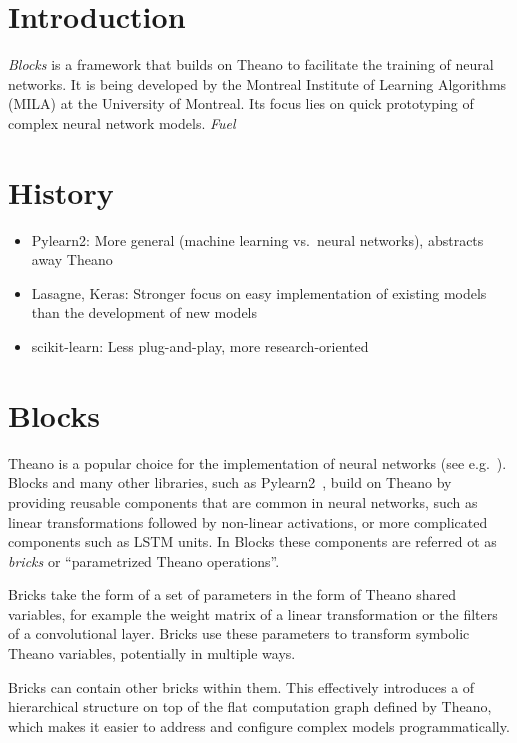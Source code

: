 \documentclass[twoside,11pt]{article}
\begin{document}
\section{Introduction}

\emph{Blocks} is a framework that builds on Theano to facilitate the training of
neural networks. It is being developed by the Montreal Institute of Learning
Algorithms (MILA) at the University of Montreal. Its focus lies on quick
prototyping of complex neural network models. \emph{Fuel} 

\section{History}


\begin{itemize}
  \item Pylearn2: More general (machine learning vs.\ neural networks), abstracts
    away Theano
  \item Lasagne, Keras: Stronger focus on easy implementation of existing models
    than the development of new models
  \item scikit-learn: Less plug-and-play, more research-oriented
\end{itemize}

\section{Blocks}

Theano is a popular choice for the implementation of neural networks (see
e.g.~\cite{Goodfellow-et-al-ICML2013, Pascanu-et-al-ICML2013}). Blocks and many
other libraries, such as Pylearn2~\cite{pylearn2_arxiv_2013}, build on Theano
by providing reusable components that are common in neural networks, such as
linear transformations followed by non-linear activations, or more complicated
components such as LSTM units. In Blocks these components are referred ot as
\emph{bricks} or ``parametrized Theano operations''.

Bricks take the form of a set of parameters in the form of Theano shared
variables, for example the weight matrix of a linear transformation or the
filters of a convolutional layer. Bricks use these parameters to transform
symbolic Theano variables, potentially in multiple ways. %

Bricks can contain other bricks within them. This effectively introduces a of
hierarchical structure on top of the flat computation graph defined by Theano,
which makes it easier to address and configure complex models programmatically.
\end{document}
